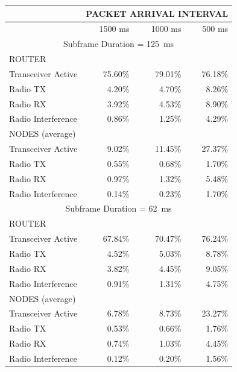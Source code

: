 \documentclass[conference]{IEEEtran}
\begin{document}
\begin{table}[tbph]
\centering
\begin{tabular}{|l|r|r|r|}
\hline
 & \multicolumn{3}{|c|}{PACKET ARRIVAL INTERVAL}\\
\hline
 & 1500 ms & 1000 ms & 500 ms \\
\hline

\multicolumn{4}{|c|}{Subframe Duration = 125~ms}\\
\hline
 ROUTER & \multicolumn{3}{|c|}{ }\\
\hline
Transceiver Active & 75.60\% & 79.01\% & 76.18\% \\
Radio TX           &  4.20\% &  4.70\% &  8.26\% \\
Radio RX           &  3.92\% &  4.53\% &  8.90\% \\
Radio Interference &  0.86\% &  1.25\% &  4.29\% \\
\hline
 NODES (average) & \multicolumn{3}{|c|}{ }\\
\hline
Transceiver Active & 9.02\% & 11.45\% & 27.37\% \\
Radio TX           & 0.55\% &  0.68\% &  1.70\% \\
Radio RX           & 0.97\% &  1.32\% &  5.48\% \\
Radio Interference & 0.14\% &  0.23\% &  1.70\% \\
\hline

\multicolumn{4}{|c|}{Subframe Duration = 62~ms}\\
\hline
 ROUTER & \multicolumn{3}{|c|}{ }\\
\hline
Transceiver Active & 67.84\% & 70.47\% & 76.24\% \\
Radio TX           &  4.52\% &  5.03\% &  8.78\% \\
Radio RX           &  3.82\% &  4.45\% &  9.05\% \\
Radio Interference &  0.91\% &  1.31\% &  4.75\% \\
\hline
 NODES (average) & \multicolumn{3}{|c|}{ }\\
\hline
Transceiver Active & 6.78\% & 8.73\% & 23.27\% \\
Radio TX           & 0.53\% & 0.66\% &  1.76\% \\
Radio RX           & 0.74\% & 1.03\% &  4.45\% \\
Radio Interference & 0.12\% & 0.20\% &  1.56\% \\
\hline


\end{tabular}
\end{table}
\end{document}
